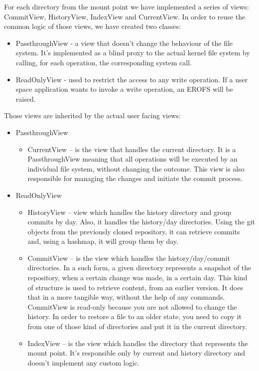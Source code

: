 For each directory from the mount point we have implemented a series of views: CommitView, HistoryView, IndexView and CurrentView. In order to reuse the common logic of those views, we have created two classes:

\begin{itemize}
    \item PassthroughView - a view that doesn't change the behaviour of the file system. It's implemented as a blind proxy to the actual kernel file system by calling, for each operation, the corresponding system call.
    \item ReadOnlyView - used to restrict the access to any write operation. If a user space application wants to invoke a write operation, an EROFS \cite{erofs} will be raised.
\end{itemize}

Those views are inherited by the actual user facing views:
\begin{itemize}
    \item PassthroughView
    \begin{itemize}
        \item CurrentView – is the view that handles the current directory. It is a PassthroughView meaning that all operations will be executed by an individual file system, without changing the outcome. This view is also responsible for managing the changes and initiate the commit process.
    \end{itemize}
    
    \item ReadOnlyView
    \begin{itemize}
        \item HistoryView – view which handles the history directory and group commits by day. Also, it handles the history/{day} directories. Using the git objects from the previously cloned repository, it can retrieve commits and, using a hashmap, it will group them by day.
        \item CommitView – is the view which handles the history/{day}/{commit} directories. In a such form, a given directory represents a snapshot of the repository, when a certain change was made, in a certain day. This kind of structure is used to retrieve content, from an earlier version. It does that in a more tangible way, without the help of any commands. CommitView is read-only because you are not allowed to change the history. In order to restore a file to an older state, you need to copy it from one of those kind of directories and put it in the current directory.
        \item IndexView – is the view which handles the directory that represents the mount point. It's responsible only by current and history directory and doesn't implement any custom logic.
    \end{itemize}
\end{itemize}

